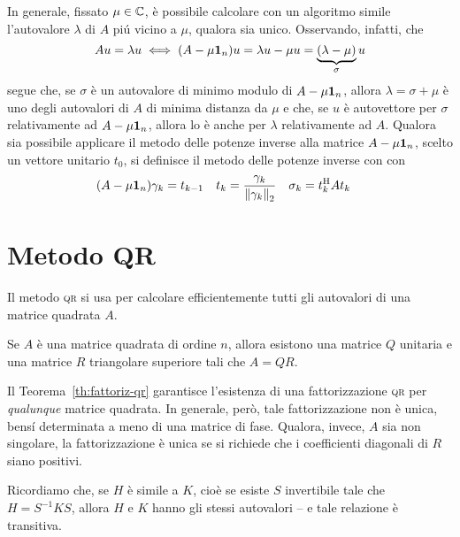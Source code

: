 	In generale, fissato \(\mu \in \mathbb{C}\), è possibile calcolare con un algoritmo simile l'autovalore \(\lambda\) di \(A\) piú vicino a \(\mu\), qualora sia unico. Osservando, infatti, che
	\begin{equation*}
		A u = \lambda u \iff (A - \mu \mathbf{1}_n) u = \lambda u - \mu u = \underbrace{(\lambda - \mu)}_{\sigma} u
	\end{equation*}
	segue che, se \(\sigma\) è un autovalore di minimo modulo di \(A - \mu \mathbf{1}_n\), allora \(\lambda = \sigma + \mu\) è uno degli autovalori di \(A\) di minima distanza da \(\mu\) e che, se \(u\) è autovettore per \(\sigma\) relativamente ad \(A - \mu \mathbf{1}_n\), allora lo è anche per \(\lambda\) relativamente ad \(A\). Qualora sia possibile applicare il metodo delle potenze inverse alla matrice \(A - \mu \mathbf{1}_n\), scelto un vettore unitario \(t_0\), si definisce il metodo delle potenze inverse con  con
	\begin{align}
		(A - \mu \mathbf{1}_n) \gamma_k &= t_{k - 1} &
		t_k &= \frac{\gamma_k}{\norm{\gamma_k}_2} &
		\sigma_k &= t_k^\mathrm{H}\relax A t_k
	\end{align}

\section[Metodo \textsc{qr}]{Metodo QR}
	
	\noindent Il metodo \textsc{qr} si usa per calcolare efficientemente tutti gli autovalori di una matrice quadrata \(A\).
	
	\begin{teorema}\label{th:fattoriz-qr}
		Se \(A\) è una matrice quadrata di ordine \(n\), allora esistono una matrice \(Q\) unitaria e una matrice \(R\) triangolare superiore tali che \(A = Q R\).
	\end{teorema}
	
	Il Teorema~\ref{th:fattoriz-qr} garantisce l'esistenza di una fattorizzazione \textsc{qr} per \emph{qualunque} matrice quadrata. In generale, però, tale fattorizzazione non è unica, bensí determinata a meno di una matrice di fase. Qualora, invece, \(A\) sia non singolare, la fattorizzazione è unica se si richiede che i coefficienti diagonali di \(R\) siano positivi.
	
	Ricordiamo che, se \(H\) è simile a \(K\), cioè se esiste \(S\) invertibile tale che \(H = S^{-1} K S\), allora \(H\) e \(K\) hanno gli stessi autovalori -- e tale relazione è transitiva.
	
